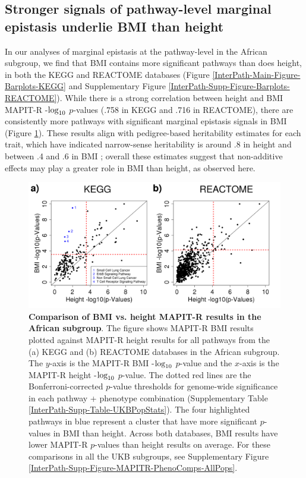\documentclass[12pt,a4paper]{article}
\def\log{{\rm log}}
\begin{document}
\subsection{Stronger signals of pathway-level marginal epistasis underlie BMI than height}

In our analyses of marginal epistasis at the pathway-level in the African subgroup, we find that BMI contains more significant pathways than does height, in both the KEGG and REACTOME databases (Figure \ref{InterPath-Main-Figure-Barplots-KEGG} and Supplementary Figure \ref{InterPath-Supp-Figure-Barplots-REACTOME}). While there is a strong correlation between height and BMI MAPIT-R -$\log_{10}$ $p$-values (.758 in KEGG and .716 in REACTOME), there are consistently more pathways with significant marginal epistasis signals in BMI (Figure \ref{InterPath-Main-Figure-MAPITR-PhenoComps-African}). These results align with pedigree-based heritability estimates for each trait, which have indicated narrow-sense heritability is around .8 in height and between .4 and .6 in BMI \citep{Elks2012,Visscher2012}; overall these estimates suggest that non-additive effects may play a greater role in BMI than height, as observed here. 

\begin{figure}[htb]
\centering
\includegraphics[scale=.45]{Images/Main/InterPath_Main_Figure_MAPITR_PhenoComps_African_vs4_legend.png}
\caption[TBD]{\textbf{Comparison of BMI vs. height MAPIT-R results in the African subgroup}. The figure shows MAPIT-R BMI results plotted against MAPIT-R height results for all pathways from the (a) KEGG and (b) REACTOME databases in the African subgroup. The $y$-axis is the MAPIT-R BMI -$\log_{10}$ $p$-value and the $x$-axis is the MAPIT-R height -$\log_{10}$ $p$-value. The dotted red lines are the Bonferroni-corrected $p$-value thresholds for genome-wide significance in each pathway + phenotype combination (Supplementary Table \ref{InterPath-Supp-Table-UKBPopStats}). The four highlighted pathways in blue represent a cluster that have more significant $p$-values in BMI than height. Across both databases, BMI results have lower MAPIT-R $p$-values than height results on average. For these comparisons in all the UKB subgroups, see Supplementary Figure \ref{InterPath-Supp-Figure-MAPITR-PhenoComps-AllPops}.}
\label{InterPath-Main-Figure-MAPITR-PhenoComps-African}
\end{figure}
\end{document}

